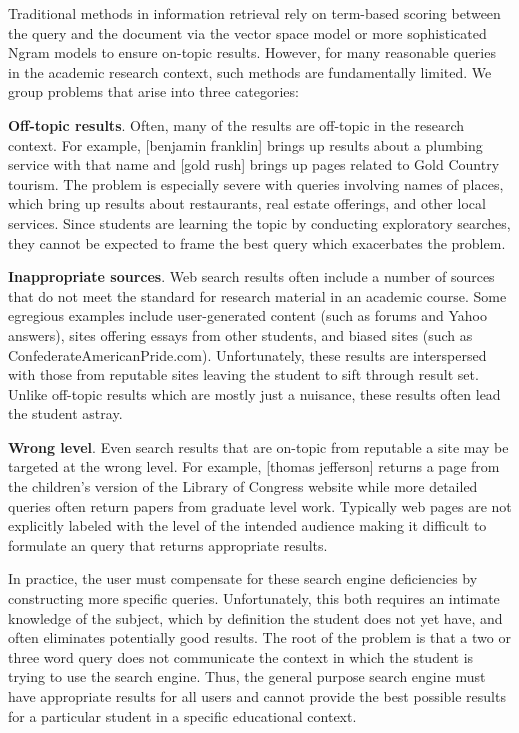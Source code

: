 \documentclass[pdfpagelabels=false,plainpages=true]{acm_proc_article-sp}
\begin{document}
Traditional methods in information retrieval rely on term-based scoring between
the query and the document via the vector space model \cite{salton1975vector} or
more sophisticated Ngram models to ensure on-topic results. However, for many
reasonable queries in the academic research context, such methods are
fundamentally limited. We group problems that arise into three categories:

{\bf Off-topic results}. Often, many of the results are off-topic in the
research context. For example, [benjamin franklin] brings up results about a
plumbing service with that name and [gold rush] brings up pages related to Gold
Country tourism. The problem is especially severe with queries involving
names of places, which bring up results about restaurants, real estate
offerings, and other local services. Since students are learning the topic by
conducting exploratory searches, they cannot be expected to frame the best query
which exacerbates the problem. 

{\bf Inappropriate sources}. Web search results often include a number of sources
that do not meet the standard for research material in an academic course. Some
egregious examples include user-generated content (such as forums and Yahoo answers), 
sites offering essays from other students, and biased sites (such as
ConfederateAmericanPride.com). Unfortunately, these results are interspersed
with those from reputable sites leaving the student to sift through result
set. Unlike off-topic results which are mostly just a nuisance, these results
often lead the student astray.   

{\bf Wrong level}. Even search results that are on-topic from reputable
a site may be targeted at the wrong level. For example, [thomas jefferson]
returns a page from the children's version of the Library of Congress
website while  more detailed queries often return papers from graduate level
work. Typically web pages are not explicitly labeled with the level of
the intended audience making it difficult to formulate an query that returns
appropriate results.

In practice, the user must compensate for these search engine deficiencies by
constructing more specific queries. Unfortunately, this both requires an
intimate knowledge of the subject, which by definition the student does not yet
have, and often eliminates potentially good results. The root of the problem is
that a two or three word query does not communicate the context in which the
student is trying to use the search engine. Thus, the general purpose
search engine must have appropriate results for all users and cannot
provide the best possible results for a particular student in a specific
educational context. 
\end{document}
